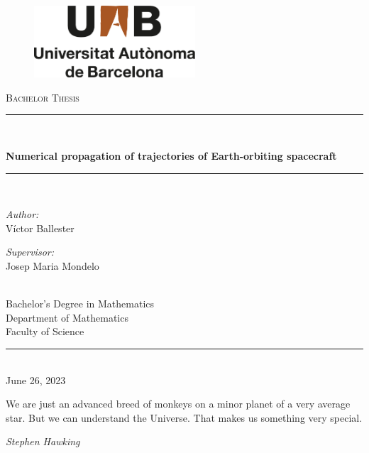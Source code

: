 \documentclass{article}
\renewcommand\title{Numerical propagation of trajectories of Earth-orbiting spacecraft}
\renewcommand\author{Víctor Ballester}
\renewcommand\date{June 26, 2023}
\newcommand\supervisor{Josep Maria Mondelo}
\newcommand\faculty{Faculty of Science}
\newcommand\department{Department of Mathematics}
\newcommand\degree{Bachelor's Degree in Mathematics}
\begin{document}
\begin{titlepage}
  \begin{center}
    \vspace*{1in}
    \begin{figure}[H]
      \begin{center}
        \includegraphics[width=6cm]{Images/uab.pdf}
      \end{center}
    \end{figure}
    \vspace*{1.5cm}
    \textsc{\Large Bachelor Thesis}\\[0.75cm]
    \rule{150mm}{0.1mm}\\[0.4cm]
    {\huge \bfseries \title\par}
    \vspace{0.4cm} %
    \rule{150mm}{0.1mm} \\[1.5cm] %
    \begin{minipage}[t]{0.4\textwidth}
      \begin{flushleft} \large
        \emph{Author:}\\[0.2cm]
        \author %
      \end{flushleft}
    \end{minipage}
    \begin{minipage}[t]{0.4\textwidth}
      \begin{flushright} \large
        \emph{Supervisor:} \\[0.2cm]
        \supervisor %
      \end{flushright}
    \end{minipage}\\[3cm]
    \vfill
    {\large
      \degree\\[0.2cm]
      \department\\[0.2cm]
      \faculty\\[0.5cm]
    }
    \rule{80mm}{0.1mm}\\[0.5cm]
    {\large \date}\\[0.2cm]
    \vfill
  \end{center}
  \newpage
\end{titlepage}
\thispagestyle{empty}
\newpage
\setcounter{page}{1}
\thispagestyle{empty}
\vspace*{\fill}
\vspace{-4cm}
\epigraph{We are just an advanced breed of monkeys on a minor planet of a very average star. But we can understand the Universe. That makes us something very special.}{\textit{Stephen Hawking}}
\vspace*{\fill}
\newpage
{}
\tableofcontents
\newpage
\end{document}
